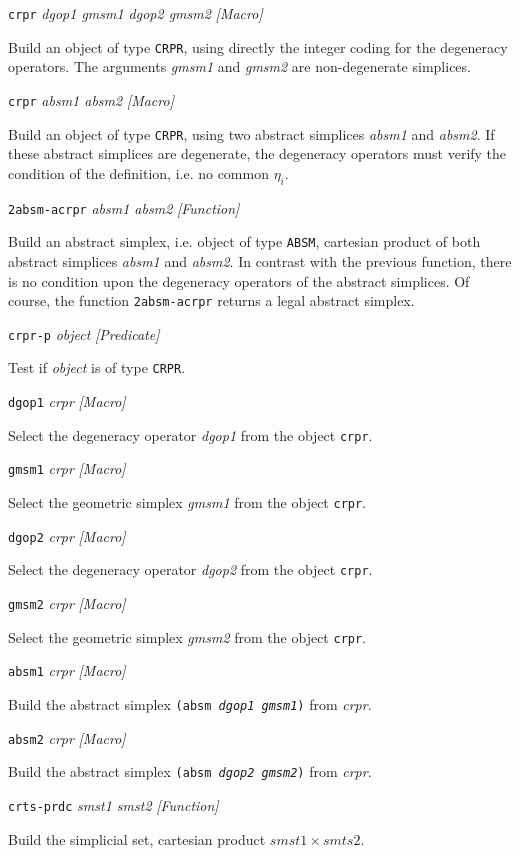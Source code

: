 {{\parindent=0mm
{\leftskip=5mm
{\tt crpr} {\em dgop1 gmsm1 dgop2 gmsm2} \hfill {\em [Macro]} \par}
{\leftskip=15mm
Build an object of type {\tt CRPR}, using directly the integer coding for the
degeneracy operators. The arguments {\em gmsm1} and {\em gmsm2} are non-degenerate
simplices.  \par}
{\leftskip=5mm
{\tt crpr} {\em absm1 absm2} \hfill {\em [Macro]} \par}
{\leftskip=15mm
Build an object of type {\tt CRPR}, using two abstract simplices {\em absm1} and {\em absm2}. If these
abstract simplices are degenerate, the de\-ge\-ne\-ra\-cy operators must verify the condition of
the definition, i.e. no common $\eta_i$. \par}
{\leftskip=5mm
{\tt 2absm-acrpr} {\em absm1 absm2} \hfill {\em [Function]} \par}
{\leftskip=15mm
Build an abstract simplex, i.e. object of type {\tt ABSM}, cartesian pro\-duct of both abstract simplices {\em absm1}
and {\em absm2}. In contrast with the previous function, there is no condition upon the
de\-ge\-ne\-ra\-cy operators of the abstract simplices. Of course, the function {\tt 2absm-acrpr} returns
a legal abstract simplex. \par}
{\leftskip=5mm
{\tt crpr-p} {\em object} \hfill {\em [Predicate]} \par}
{\leftskip=15mm
Test if {\em object} is of type {\tt CRPR}. \par}
{\leftskip=5mm
{\tt dgop1} {\em crpr} \hfill {\em [Macro]} \par}
{\leftskip=15mm
Select the degeneracy operator {\em dgop1} from the object {\tt crpr}. \par}
{\leftskip=5mm
{\tt gmsm1} {\em crpr} \hfill {\em [Macro]} \par}
{\leftskip=15mm
Select the geometric simplex {\em gmsm1} from the object {\tt crpr}. \par}
{\leftskip=5mm
{\tt dgop2} {\em crpr} \hfill {\em [Macro]} \par}
{\leftskip=15mm
Select the degeneracy operator {\em dgop2} from the object {\tt crpr}. \par}
{\leftskip=5mm
{\tt gmsm2} {\em crpr} \hfill {\em [Macro]} \par}
{\leftskip=15mm
Select the geometric simplex {\em gmsm2} from the object {\tt crpr}. \par}
{\leftskip=5mm
{\tt absm1} {\em crpr} \hfill {\em [Macro]} \par}
{\leftskip=15mm
Build the abstract simplex {\tt (absm {\em dgop1 gmsm1})} from {\em crpr}. \par}
{\leftskip=5mm
{\tt absm2} {\em crpr} \hfill {\em [Macro]} \par}
{\leftskip=15mm
Build the abstract simplex {\tt (absm {\em dgop2 gmsm2})} from {\em crpr}. \par}
{\leftskip=5mm
{\tt crts-prdc} {\em smst1 smst2} \hfill {\em [Function]} \par}
{\leftskip=15mm
Build the simplicial set, cartesian product $smst1 \times smts2$. \par}
}

}
